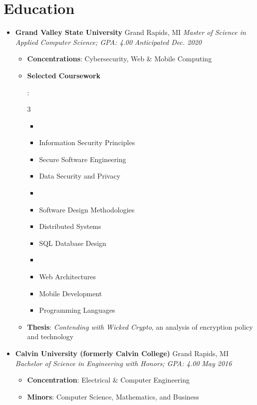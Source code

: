 \documentclass[letterpaper,11pt]{article}
\newcommand{\resumeItem}[2]{
  \item\small{
    \textbf{#1}{: #2 \vspace{-2pt}}
  }
}
\newcommand{\resumeSubheading}[4]{
  \vspace{-1pt}\item
    \textbf{#1} \dotfill #2 \newline
    \textit{\small#3} \hfill \textit{\small #4}
  \vspace{-5pt}
}
\newcommand{\resumeSubHeadingListStart}{\begin{itemize}[leftmargin=*]}
\newcommand{\resumeSubHeadingListEnd}{\end{itemize}}
\newcommand{\resumeItemListStart}{\begin{itemize}}
\newcommand{\resumeItemListEnd}{\end{itemize}\vspace{-5pt}}
\newcommand{\resumeListMulticolStart}[1]{
  \vspace{-2.4em}
  \setlength{\columnsep}{-1pc}
  \begin{multicols}{#1}
    \begin{itemize}[label={}]
      \item
}
\newcommand{\resumeListMulticolEnd}{
    \end{itemize}
  \end{multicols}
  \vspace{-10pt}
}
\begin{document}
\section{Education}
  \resumeSubHeadingListStart
    \resumeSubheading
      {Grand Valley State University}{Grand Rapids, MI}
      {Master of Science in Applied Computer Science; GPA: 4.00}{Anticipated Dec. 2020}
      \resumeItemListStart
        \resumeItem{Concentrations}
          {Cybersecurity, Web \& Mobile Computing}
        \resumeItem{Selected Coursework}
          {
            \resumeListMulticolStart{3}
              \item Information Security Principles
              \item Secure Software Engineering
              \item Data Security and Privacy
              \item %
              \item Software Design Methodologies
              \item Distributed Systems
              \item SQL Database Design
              \item %
              \item Web Architectures
              \item Mobile Development
              \item Programming Languages
            \resumeListMulticolEnd
          }
        \resumeItem{Thesis}
          {\textit{Contending with Wicked Crypto}, an analysis of encryption policy and technology}
      \resumeItemListEnd
    \resumeSubheading
      {Calvin University (formerly Calvin College)}{Grand Rapids, MI}
      {Bachelor of Science in Engineering with Honors; GPA: 4.00}{May 2016}
      \resumeItemListStart
        \resumeItem{Concentration}
          {Electrical \& Computer Engineering}
        \resumeItem{Minors}
          {Computer Science, Mathematics, and Business}
      \resumeItemListEnd
  \resumeSubHeadingListEnd
\end{document}
